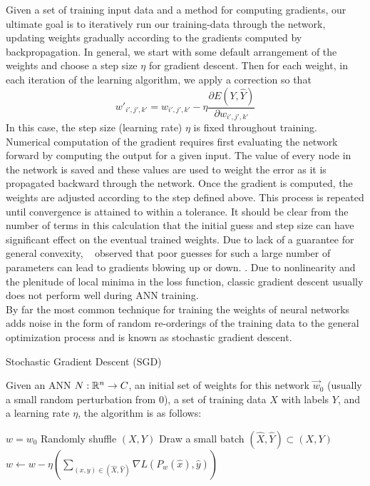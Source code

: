 Given a set of training input data and a method for computing gradients, our ultimate goal is to iteratively run our training-data through the network, updating weights gradually according to the gradients computed by backpropagation. In general, we start with some
default arrangement of the weights and choose a step
size $\eta$ for gradient descent. Then for each weight, in each iteration
of the learning algorithm, we apply a correction so that 
\[w'_{i',j',k'} = w_{i',j',k'}-\eta \frac{\partial E(Y,\hat Y)}{\partial
    w_{i',j',k'}}\]
    In this case, the step size (learning rate) $\eta$ is fixed throughout training.
    Numerical computation of the gradient requires first evaluating the network forward by computing the output for a given input. The value of every node in the network is saved and these values are used to weight the error as it is propagated backward through the network. Once the gradient is computed, the weights are adjusted according to the step defined above. This process is repeated until convergence is attained to within a tolerance. It should be
clear from the number of terms in this calculation that the initial
guess and step size can have significant effect on the eventual trained weights.
Due to lack of a guarantee for general convexity,
~\citet{Bishop:2006:PRM:1162264} observed that poor guesses for such a large number of parameters can lead
to gradients blowing up or down. 
. Due to nonlinearity and the plenitude of local minima in the loss function, classic gradient descent usually does not perform well during ANN training. \\ 
By far the most common technique for training the weights of neural networks adds noise in the form of random re-orderings of the training data to the general optimization process and is known as stochastic gradient descent. 
\begin{definition}{Stochastic Gradient Descent (SGD)}

Given an ANN $N: \mathbb{R}^n \to C$, an initial set of weights for this network $\vec w_0$ (usually a small random perturbation from 0), a set of training data $X$ with labels $Y$, and a learning rate $\eta$, the algorithm is as follows: 

\begin{algorithm}
\caption*{Batch Stochastic Gradient Descent}\label{sgd}
\begin{algorithmic}[H]
\State $w = w_0$
 
\State Randomly shuffle $(X,Y)$
\State Draw a small batch $(\hat X, \hat Y) \subset (X, Y)$
\State $w \leftarrow w - \eta \left(\sum_{(x,y) \in (\hat X, \hat Y)}  \nabla L(P_w(\hat x), \hat y)\right)$
\EndWhile
\end{algorithmic}
\end{algorithm}
\end{definition}
